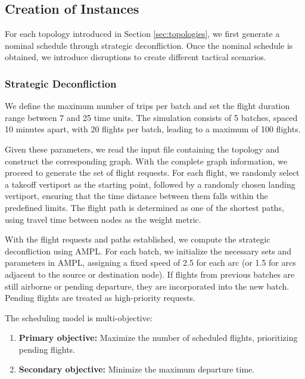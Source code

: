 \documentclass[../../thesis.tex]{subfiles}
\begin{document}
\subsection{Creation of Instances}\label{sec:generationInstance}

For each topology introduced in Section \ref{sec:topologies}, we first generate a nominal schedule through strategic deconfliction.  
Once the nominal schedule is obtained, we introduce disruptions to create different tactical scenarios.

\subsubsection{Strategic Deconfliction}

We define the maximum number of trips per batch and set the flight duration range between 7 and 25 time units.  
The simulation consists of 5 batches, spaced 10 minutes apart, with 20 flights per batch, leading to a maximum of 100 flights.  

Given these parameters, we read the input file containing the topology and construct the corresponding graph.  
With the complete graph information, we proceed to generate the set of flight requests.  
For each flight, we randomly select a takeoff vertiport as the starting point, followed by a randomly chosen landing vertiport, ensuring that the time distance between them falls within the predefined limits.  
The flight path is determined as one of the shortest paths, using travel time between nodes as the weight metric.  

With the flight requests and paths established, we compute the strategic deconfliction using AMPL.  
For each batch, we initialize the necessary sets and parameters in AMPL, assigning a fixed speed of 2.5 for each arc (or 1.5 for arcs adjacent to the source or destination node).  
If flights from previous batches are still airborne or pending departure, they are incorporated into the new batch.  
Pending flights are treated as high-priority requests.  

The scheduling model is multi-objective:  
\begin{enumerate}
    \item \textbf{Primary objective:} Maximize the number of scheduled flights, prioritizing pending flights. 
    \item \textbf{Secondary objective:} Minimize the maximum departure time.  
\end{enumerate}
\end{document}
